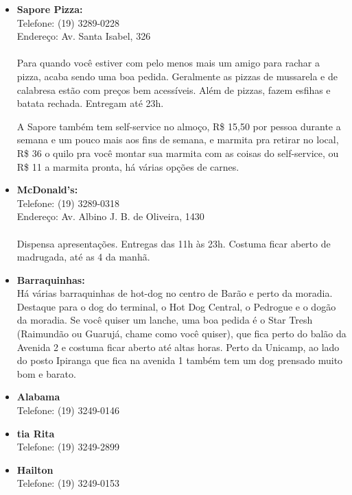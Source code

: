 \begin{itemize}
      \item \textbf{Sapore Pizza:}
        \\Telefone: (19) 3289-0228
        \\Endereço: Av. Santa Isabel, 326
        \\\\
        Para quando você estiver com pelo menos mais um amigo para rachar a
        pizza, acaba sendo uma boa pedida. Geralmente as pizzas de mussarela e
        de calabresa estão com preços bem acessíveis. Além de pizzas, fazem
        esfihas e batata rechada. Entregam até 23h.

        A Sapore também tem self-service no almoço, R\$ 15,50 por pessoa
        durante a semana e um pouco mais aos fins de semana, e marmita pra
        retirar no local, R\$ 36 o quilo pra você montar sua marmita com as
        coisas do self-service, ou R\$ 11 a marmita pronta, há várias opções de
        carnes.

    \item   \textbf{McDonald's:}
        \\Telefone: (19) 3289-0318
        \\Endereço: Av. Albino J. B. de Oliveira, 1430
        \\\\
        Dispensa apresentações. Entregas das 11h às 23h. Costuma ficar aberto
        de madrugada, até as 4 da manhã.

    \item   \textbf{Barraquinhas:}
        \\Há várias barraquinhas de hot-dog no centro de Barão e perto da
        moradia. Destaque para o dog do terminal, o Hot Dog Central, o Pedrogue
        e o dogão da moradia. Se você quiser um lanche, uma boa pedida é o Star
        Tresh (Raimundão ou Guarujá, chame como você quiser), que fica perto do
        balão da Avenida 2 e costuma ficar aberto até altas horas. Perto da
        Unicamp, ao lado do posto Ipiranga que fica na avenida 1 também tem um
        dog prensado muito bom e barato.
\end{itemize}

%
%


\begin{itemize}
    \item   \textbf{Alabama}
        \\Telefone: (19) 3249-0146

    \item   \textbf{tia Rita}
        \\Telefone: (19) 3249-2899

    \item   \textbf{Hailton}
        \\Telefone: (19) 3249-0153
\end{itemize}

